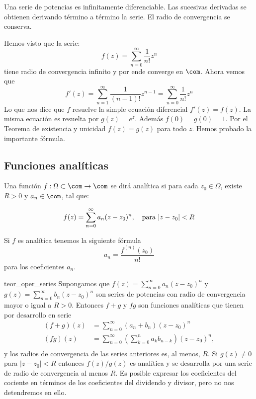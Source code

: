 \begin{corolario}  Una serie de potencias es infinitamente diferenciable. Las sucesivas derivadas se obtienen derivando término a término la serie. El radio de convergencia se conserva.
\end{corolario}

\begin{ejemplo}{}  Hemos visto que la serie:
\[
	f(z)=\sum_{n=0}^{\infty}\frac{1}{n!}z^n
\]
tiene radio de convergencia infinito y por ende converge en $\com$. Ahora vemos que
\[f'(z)=\sum_{n=1}^{\infty}\frac{1}{(n-1)!}z^{n-1} =\sum_{n=0}^{\infty}\frac{1}{n!}z^n
\]
Lo que nos dice que $f$ resuelve la simple ecuación diferencial $f'(z)=f(z)$. La misma ecuación es resuelta por $g(z)=e^z$. Además $f(0)=g(0)=1$. Por el Teorema de existencia y unicidad $f(z)=g(z)$ para todo $z$. Hemos probado la importante fórmula.
\end{ejemplo}
\subsection{Funciones analíticas}
\begin{definicion}{} Una función $f:\Omega\subset\com\to\com$ se dirá analítica si para cada $z_0\in\Omega$, existe  $R>0$ y $a_n\in\com$, tal que:

\[ f(z)=\sum_{n=0}^{\infty}a_n(z-z_0)^n,\quad\hbox{para } |z-z_0|<R \]
\end{definicion}


\begin{ejercicio} Si $f$ es analítica tenemos la siguiente fórmula
\[
	a_n=\frac{f^{(n)}(z_0)}{n!}
\]
para los coeficientes $a_n$.
\end{ejercicio}

 \begin{teorema}{teor_oper_series} Supongamos que $f(z)=\sum_{n=0}^{\infty}a_n(z-z_0)^n$ y  $g(z)=\sum_{n=0}^{\infty}b_n(z-z_0)^n$ son series de potencias con radio de convergencia mayor o igual a $R>0$. Entonces $f+g$ y $fg$ son funciones analíticas que tienen por desarrollo en serie
\[
    \begin{split}
      (f+g)(z)&=\sum_{n=0}^{\infty}(a_n+b_n)(z-z_0)^n\\
      (fg)(z)&=\sum_{n=0}^{\infty}\left(\sum_{k=0}^na_kb_{n-k}\right)(z-z_0)^n,\\
    \end{split}
\]
y los radios de convergencia de las series anteriores es, al menos, $R$. Si $g(z)\neq 0$ para $|z-z_0|<R$ entonces $f(z)/g(z)$ es analítica y se desarrolla por  una  serie de radio de convergencia al menos $R$. Es posible expresar los coeficientes del cociente en términos de los coeficientes del dividendo y divisor, pero no nos detendremos en ello.
\end{teorema}



